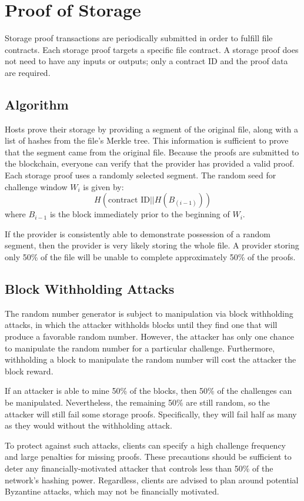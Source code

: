 \documentclass[twocolumn]{article}
\begin{document}
\section{Proof of Storage}
\label{sec:storage}
Storage proof transactions are periodically submitted in order to fulfill file contracts.
Each storage proof targets a specific file contract.
A storage proof does not need to have any inputs or outputs; only a contract ID and the proof data are required.

\subsection{Algorithm}
Hosts prove their storage by providing a segment of the original file, along with a list of hashes from the file's Merkle tree.
This information is sufficient to prove that the segment came from the original file.
Because the proofs are submitted to the blockchain, everyone can verify that the provider has provided a valid proof.
Each storage proof uses a randomly selected segment.
The random seed for challenge window $W_i$ is given by:
\[
	H(\text{contract ID} || H(B_(i-1)))
\]
where $B_{i-1}$ is the block immediately prior to the beginning of $W_i$.

If the provider is consistently able to demonstrate possession of a random segment, then the provider is very likely storing the whole file.
A provider storing only 50\% of the file will be unable to complete approximately 50\% of the proofs.

\subsection{Block Withholding Attacks}
The random number generator is subject to manipulation via block withholding attacks, in which the attacker withholds blocks until they find one that will produce a favorable random number.
However, the attacker has only one chance to manipulate the random number for a particular challenge.
Furthermore, withholding a block to manipulate the random number will cost the attacker the block reward.

If an attacker is able to mine 50\% of the blocks, then 50\% of the challenges can be manipulated.
Nevertheless, the remaining 50\% are still random, so the attacker will still fail some storage proofs.
Specifically, they will fail half as many as they would without the withholding attack.

To protect against such attacks, clients can specify a high challenge frequency and large penalties for missing proofs.
These precautions should be sufficient to deter any financially-motivated attacker that controls less than 50\% of the network's hashing power.
Regardless, clients are advised to plan around potential Byzantine attacks, which may not be financially motivated.
\end{document}
